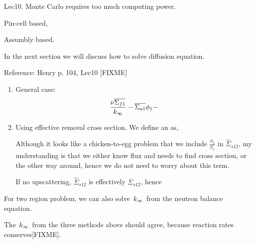 \documentclass{school-22.211-notes}
\date{March 14, 2012}
\begin{document}
\maketitle

Lec10. Monte Carlo requires too much computing power. 


Pin-cell based, 


Assumbly based. 




In the next section we will discuss how to solve diffusion equation. 


Reference: Henry p. 104, Lec10 [FIXME] 





\begin{enumerate}
\item General case: 
  \begin{align}
    \frac{\nu \overline{\Sigma_{f1}}}{\left. k_{\infty} \right.} - \overline{\Sigma_{a1}} \phi_1 - \\
  \end{align}

\item Using effective removal cross section. We define an  as,
  

   Although it looks like a chicken-to-egg problem that we include $\frac{\phi_2}{\phi_1}$ in $\hat{\Sigma}_{s12}$, my understanding is that we either know flux and needs to find cross section, or the other way around, hence we do not need to worry about this term. 

   If no upscattering, $\hat{\Sigma}_{s12}$ is effectively $\overline{\Sigma}_{s12}$, hence 
\end{enumerate}

For two region problem, we can also solve $\left. k_{\infty} \right.$ from the neutron balance equation. 





The $\left. k_{\infty} \right.$ from the three methods above should agree, because reaction rates conserves[FIXME].
\end{document}
